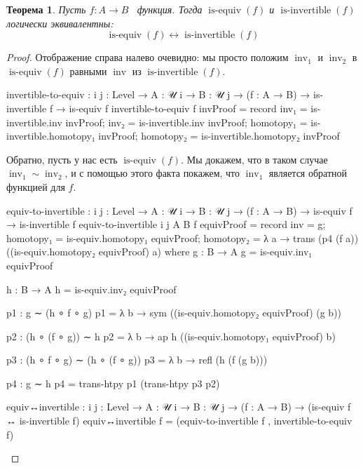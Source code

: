 \documentclass{article}[12pt]
\newtheorem{theorem}{Теорема}
\newcommand{\dash}{\textemdash\ }
\newcommand{\op}{\operatorname}
\begin{document}
\begin{theorem}
    \label{EquivAndInverseAreSameTheorem}
    Пусть $f : A \rightarrow B$ \dash функция. Тогда $\op{is-equiv}(f)$ и $\op{is-invertible}(f)$
    логически эквивалентны:
    $$\op{is-equiv}(f) \leftrightarrow \op{is-invertible}(f)$$
\end{theorem}
\begin{proof}
Отображение справа налево очевидно: мы просто положим $\op{inv}_1$ и $\op{inv}_2$ 
в $\op{is-equiv}(f)$ равными $\op{inv}$ из $\op{is-invertible}(f)$.
\begin{code}
invertible-to-equiv : {i j : Level} → {A : 𝒰 i} → {B : 𝒰 j}
                      → (f : A → B) → is-invertible f
                      → is-equiv f
invertible-to-equiv f invProof = 
    record {inv₁ = is-invertible.inv invProof;
            inv₂ = is-invertible.inv invProof;
            homotopy₁ = is-invertible.homotopy₁ invProof;
            homotopy₂ = is-invertible.homotopy₂ invProof}
\end{code}

Обратно, пусть у нас есть $\op{is-equiv}(f)$. Мы докажем, что в таком случае $\op{inv}_1 \sim \op{inv}_2$, и
с помощью этого факта покажем, что $\op{inv}_1$ является обратной функцией для $f$.
\begin{code}
equiv-to-invertible : {i j : Level} → {A : 𝒰 i} → {B : 𝒰 j}
                      → (f : A → B) → is-equiv f
                      → is-invertible f
equiv-to-invertible {i} {j} {A} {B} f equivProof = 
    record {inv = g;
            homotopy₁ = is-equiv.homotopy₁ equivProof;
            homotopy₂ = λ a → trans (p4 (f a)) ((is-equiv.homotopy₂ equivProof) a)}
    where
        g : B → A
        g = is-equiv.inv₁ equivProof

        h : B → A
        h = is-equiv.inv₂ equivProof

        p1 : g ∼ (h ∘ f ∘ g)
        p1 = λ b → sym ((is-equiv.homotopy₂ equivProof) (g b))

        p2 : (h ∘ (f ∘ g)) ∼ h
        p2 = λ b → ap h ((is-equiv.homotopy₁ equivProof) b)

        p3 : (h ∘ f ∘ g) ∼ (h ∘ (f ∘ g))
        p3 = λ b → refl (h (f (g b)))

        p4 : g ∼ h
        p4 = trans-htpy p1 (trans-htpy p3 p2)

equiv↔invertible : {i j : Level} → {A : 𝒰 i} → {B : 𝒰 j}
                   → (f : A → B)
                   → (is-equiv f ↔ is-invertible f)
equiv↔invertible f = (equiv-to-invertible f , invertible-to-equiv f)
\end{code}
\end{proof}
\end{document}
